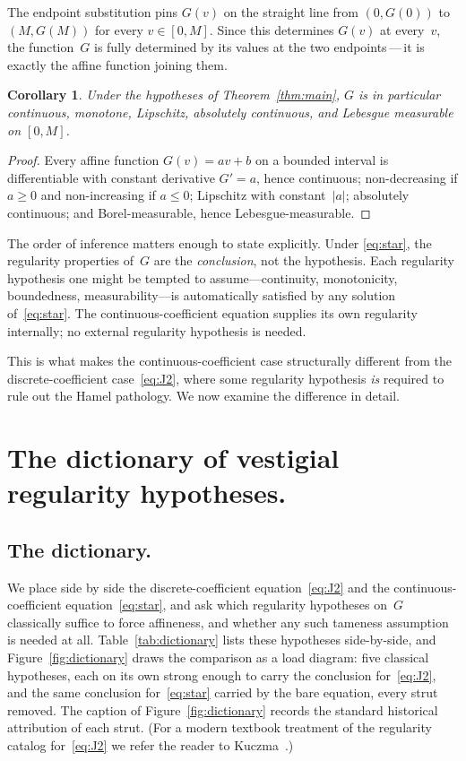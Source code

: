 \documentclass{article}
\theoremstyle{plain}
\newtheorem{corollary}[theorem]{Corollary}
\theoremstyle{definition}
\begin{document}
The endpoint substitution pins $G(v)$ on the straight line from
$(0,G(0))$ to $(M,G(M))$ for every $v\in[0,M]$. Since this determines
$G(v)$ at every~$v$, the function~$G$ is fully determined by its values
at the two endpoints\,---\,it is exactly the affine function joining them.

\begin{corollary}\label{cor:regularity}
Under the hypotheses of Theorem~\ref{thm:main}, $G$ is in particular
continuous, monotone, Lipschitz, absolutely continuous, and
Lebesgue measurable on $[0,M]$.
\end{corollary}

\begin{proof}
Every affine function $G(v)=av+b$ on a bounded interval is differentiable
with constant derivative $G'=a$, hence continuous; non-decreasing if
$a\ge0$ and non-increasing if $a\le0$; Lipschitz with constant~$|a|$;
absolutely continuous; and Borel-measurable, hence Lebesgue-measurable.
\end{proof}

The order of inference matters enough to state explicitly. Under
\eqref{eq:star}, the regularity properties of~$G$ are the
\emph{conclusion}, not the hypothesis. Each regularity hypothesis one
might be tempted to assume---continuity, monotonicity, boundedness,
measurability---is automatically satisfied by any solution
of~\eqref{eq:star}. The continuous-coefficient equation supplies its own
regularity internally; no external regularity hypothesis is needed.

This is what makes the continuous-coefficient case structurally different
from the discrete-coefficient case~\eqref{eq:J2}, where some regularity
hypothesis \emph{is} required to rule out the Hamel pathology. We now
examine the difference in detail.

\section{The dictionary of vestigial regularity hypotheses.}
\label{sec:dictionary}

\subsection{The dictionary.}
\label{ssec:dict-table}

We place side by side the discrete-coefficient equation~\eqref{eq:J2}
and the continuous-coefficient equation~\eqref{eq:star}, and ask which regularity hypotheses on~$G$ classically suffice to force affineness, and whether any such tameness assumption is needed at all. Table~\ref{tab:dictionary} lists these hypotheses side-by-side,
and Figure~\ref{fig:dictionary} draws the comparison as a load
diagram: five classical hypotheses, each on its own strong enough
to carry the conclusion for~\eqref{eq:J2}, and the same conclusion
for~\eqref{eq:star} carried by the bare equation, every strut
removed. The caption of Figure~\ref{fig:dictionary} records the standard historical attribution of
each strut. (For a modern textbook treatment of the regularity
catalog for~\eqref{eq:J2} we refer the reader to
Kuczma~\cite[\S13.2]{Kuczma2009}.)
\end{document}
